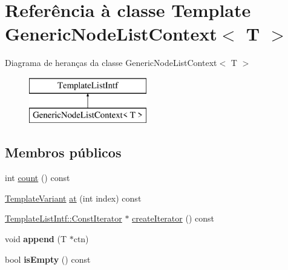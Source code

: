 \hypertarget{class_generic_node_list_context}{\section{Referência à classe Template Generic\-Node\-List\-Context$<$ T $>$}
\label{class_generic_node_list_context}
}
Diagrama de heranças da classe Generic\-Node\-List\-Context$<$ T $>$\begin{figure}[H]
\begin{center}
\leavevmode
\includegraphics[height=2.000000cm]{class_generic_node_list_context}
\end{center}
\end{figure}
\subsection*{Membros públicos}
\begin{DoxyCompactItemize}
\item 
int \hyperlink{class_generic_node_list_context_a0745638c9967e2ed90bc96c012288c55}{count} () const 
\item 
\hyperlink{class_template_variant}{Template\-Variant} \hyperlink{class_generic_node_list_context_a55f90d50fcb1378b2a97b9c3ad5bb162}{at} (int index) const 
\item 
\hyperlink{class_template_list_intf_1_1_const_iterator}{Template\-List\-Intf\-::\-Const\-Iterator} $\ast$ \hyperlink{class_generic_node_list_context_ac47c74a58be692c052b883b5d5f9fcb4}{create\-Iterator} () const 
\item 
\hypertarget{class_generic_node_list_context_a642d5f0782f108e0a8e76028245532d7}{void {\bfseries append} (T $\ast$ctn)}\label{class_generic_node_list_context_a642d5f0782f108e0a8e76028245532d7}

\item 
\hypertarget{class_generic_node_list_context_a479432127ee77145cc19d6a2d1590821}{bool {\bfseries is\-Empty} () const }\label{class_generic_node_list_context_a479432127ee77145cc19d6a2d1590821}

\end{DoxyCompactItemize}


